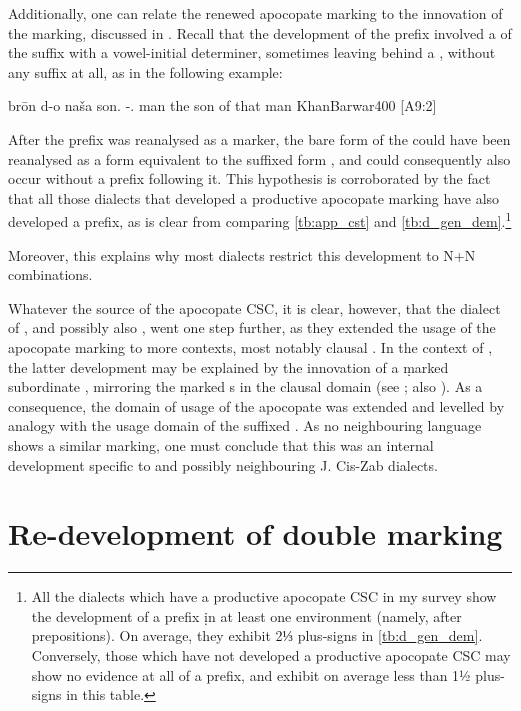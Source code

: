 Additionally, one can relate the renewed apocopate marking to the innovation of the \gen* marking, discussed in . Recall that the development of the \gen* prefix involved a  of the \ed suffix with a vowel-initial determiner, sometimes leaving  behind a , without any suffix at all, as in the following \Barw example:

{brōn\cb{} d-o\cb{} naša}
{son.\cst{} \gen-.\masc\cb{} man}
{the son of that man}
{KhanBarwar}{400 {[A9:2]}}

After the \d prefix was reanalysed as a \gen* marker, the bare form of the \prim could have been reanalysed as a \cst* form equivalent to the suffixed form , and could consequently also occur without a \gen* prefix following it. This hypothesis is corroborated by the fact that all those dialects that developed a productive apocopate \cst* marking have also developed  a \gen* prefix, as is clear from comparing \vref{tb:app_cst} and \vref{tb:d_gen_dem}.\footnote{All the dialects which have a productive apocopate CSC in my survey show the development of a \gen* prefix \d in at least one environment (namely, after prepositions). On average, they exhibit 2⅓ plus-signs in \ref{tb:d_gen_dem}. Conversely, those which have not developed a productive apocopate CSC may show no evidence at all of a \gen* prefix, and exhibit on average less than 1½ plus-signs in this table.}

  Moreover, this explains why most dialects restrict this development to N+N combinations.  

Whatever the source of the apocopate CSC, it is clear, however, that the dialect of \JZax, and possibly also \Amd, went one step further, as they extended the usage of the apocopate \cst* marking to more contexts, most notably clausal \secns. In the context of \JZax, the latter development may be explained by the innovation of a \d marked subordinate , mirroring the \d marked \gen* \dem*s in the clausal domain (see ; also \cites[90]{CohenNucleus}[119ff.]{CohenZakho}). As a consequence, the domain of usage of the apocopate \cst* was extended and levelled by analogy with the usage domain of the suffixed \cst*. As no neighbouring language  shows a similar \cst* marking, one must conclude that this was an internal development specific to \JZax and possibly neighbouring J. Cis-Zab dialects. 

\section{Re-development of double marking} \label{ss:double}

